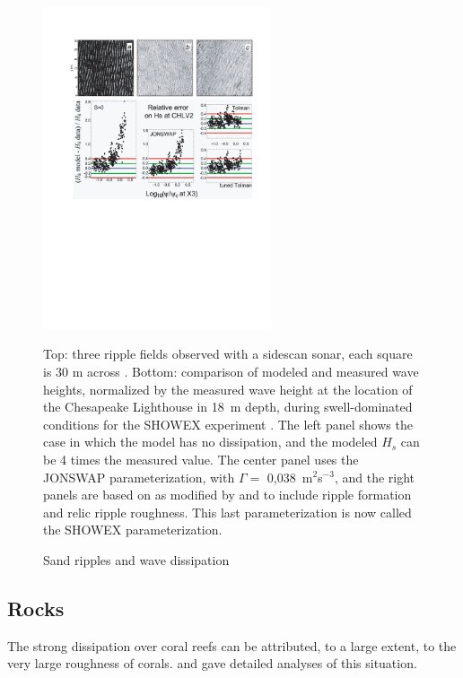 \begin{figure}[htb]
\centerline{\includegraphics[width=0.6\textwidth]{FIGS_CH_BBL/rides.pdf}}
  \caption{Sand ripples and wave dissipation}
  {Top: three ripple fields observed with a sidescan sonar, each square is 30 m across \citep{Ardhuin&al.2002}. Bottom: 
  comparison of modeled and measured wave heights, normalized by the measured wave height at the location of the Chesapeake Lighthouse in 18~m depth, during swell-dominated conditions for the SHOWEX experiment \citep{Ardhuin&al.2003b}. The left panel shows the case in which the model has no dissipation, and the modeled $H_s$ can be 4 times the measured value. The center panel uses the JONSWAP parameterization, with $\Gamma =$ 0,038~m$^{2}$s$^{-3}$, and the right panels are based on \cite{Grant&Madsen1979} as modified by 
  \cite{Tolman1994} and \cite{Ardhuin&al.2003a} to include ripple formation and relic ripple roughness. This last parameterization is now called the SHOWEX parameterization.}
  \label{rides}
\end{figure}

\subsection{Rocks}
The strong dissipation over coral reefs can be attributed, to a large extent, to the very large roughness of corals. \cite{Lowe&al.2007} 
and \cite{Monismith&al.2015} gave detailed analyses of this situation. 


